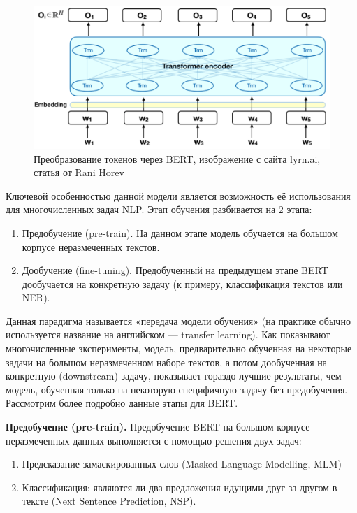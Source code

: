 \documentclass[12pt,a4paper]{article}
\begin{document}
\begin{figure}[H]
	\begin{center}
		\includegraphics[scale=0.3]{trans2.png}
	\end{center}
	\caption{Преобразование токенов через BERT, изображение с сайта lyrn.ai, статья от Rani Horev}
\end{figure}

Ключевой особенностью данной модели является возможность её использования для многочисленных задач NLP. Этап обучения разбивается на 2 этапа:
\begin{enumerate}
    \item Предобучение (pre-train). На данном этапе модель обучается на большом корпусе неразмеченных текстов.
    \item Дообучение (fine-tuning). Предобученный на предыдущем этапе BERT дообучается на конкретную задачу (к примеру, классификация текстов или NER).
\end{enumerate}

\noindent Данная парадигма называется «передача модели обучения» (на практике обычно используется название на английском --- transfer learning). Как показывают многочисленные эксперименты, модель, предварительно обученная на некоторые задачи на большом неразмеченном наборе текстов, а потом дообученная на конкретную (downstream) задачу, показывает гораздо лучшие результаты, чем модель, обученная только на некоторую специфичную задачу без предобучения. Рассмотрим более подробно данные этапы для BERT.

\textbf{Предобучение (pre-train).} Предобучение BERT на большом корпусе неразмеченных данных выполняется с помощью решения двух задач:
\begin{enumerate}
    \item Предсказание замаскированных слов (Masked Language Modelling, MLM)
    \item Классификация: являются ли два предложения идущими друг за другом в тексте (Next Sentence Prediction, NSP).
\end{enumerate}
\end{document}
